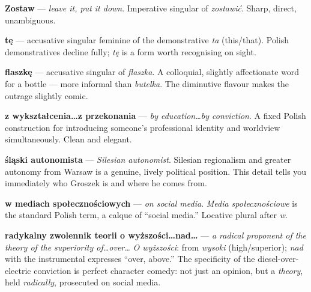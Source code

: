 

\textbf{Zostaw} — \textit{leave it, put it down}. Imperative singular of 
\textit{zostawić}. Sharp, direct, unambiguous.

\textbf{tę} — accusative singular feminine of the demonstrative \textit{ta} 
(this/that). Polish demonstratives decline fully; \textit{tę} is a form 
worth recognising on sight.

\textbf{flaszkę} — accusative singular of \textit{flaszka}. A colloquial, 
slightly affectionate word for a bottle — more informal than \textit{butelka}. 
The diminutive flavour makes the outrage slightly comic.



\textbf{z wykształcenia\ldots z przekonania} — \textit{by education\ldots by conviction}. 
A fixed Polish construction for introducing someone's professional identity 
and worldview simultaneously. Clean and elegant.

\textbf{śląski autonomista} — \textit{Silesian autonomist}. Silesian regionalism 
and greater autonomy from Warsaw is a genuine, lively political position. 
This detail tells you immediately who Groszek is and where he comes from.

\textbf{w mediach społecznościowych} — \textit{on social media}. 
\textit{Media społecznościowe} is the standard Polish term, a calque of 
``social media.'' Locative plural after \textit{w}.

\textbf{radykalny zwolennik teorii o wyższości\ldots nad\ldots} — 
\textit{a radical proponent of the theory of the superiority of\ldots over\ldots} 
\textit{O wyższości}: from \textit{wysoki} (high/superior); \textit{nad} 
with the instrumental expresses ``over, above.'' The specificity of the 
diesel-over-electric conviction is perfect character comedy: not just an 
opinion, but a \textit{theory}, held \textit{radically}, prosecuted on social media.

